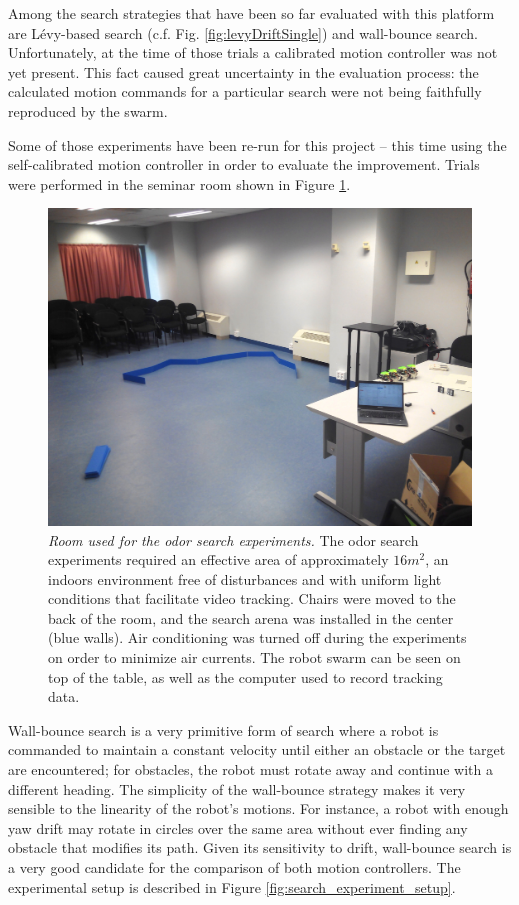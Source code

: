 \documentclass[12pt,twoside]{report}
\begin{document}
Among the search strategies that have been so far evaluated with this platform are L\'{e}vy-based search (c.f. Fig. \ref{fig:levyDriftSingle}) and wall-bounce search.
Unfortunately, at the time of those trials a calibrated motion controller was not yet present. This fact caused great uncertainty in the evaluation process: the calculated motion commands for a particular search were not being faithfully reproduced by the swarm.

Some of those experiments have been re-run for this project -- this time using the self-calibrated motion controller in order to evaluate the improvement. Trials were performed in the seminar room shown in Figure \ref{fig:experiments_room}.

\begin{figure}[hbtp]
\centerline{\includegraphics[width=0.7\linewidth]{experiments_room}}
\caption[Room used for the odor search experiments]{\emph{Room used for the odor search experiments.} The odor search experiments required an effective area of approximately $16m^2$, an indoors environment free of disturbances and with uniform light conditions that facilitate video tracking.
Chairs were moved to the back of the room, and the search arena was installed in the center (blue walls). Air conditioning was turned off during the experiments on order to minimize air currents. The robot swarm can be seen on top of the table, as well as the computer used to record tracking data.
}
\label{fig:experiments_room}
\end{figure}


Wall-bounce search is a very primitive form of search where a robot is commanded to maintain a constant velocity until either an obstacle or the target are encountered; for obstacles, the robot must rotate away and continue with a different heading.
The simplicity of the wall-bounce strategy makes it very sensible to the linearity of the robot's motions. For instance, a robot with enough yaw drift may rotate in circles  over the same area without ever finding any obstacle that modifies its path. Given its sensitivity to drift, wall-bounce search is a very good candidate for the comparison of both motion controllers.
The experimental setup is described in Figure \ref{fig:search_experiment_setup}.
\end{document}
